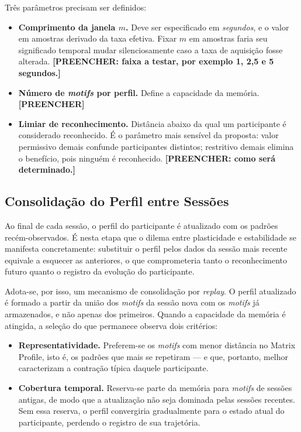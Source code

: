 Três parâmetros precisam ser definidos:

\begin{itemize}
    \item \textbf{Comprimento da janela $m$.} Deve ser especificado em
    \textit{segundos}, e o valor em amostras derivado da taxa efetiva.
    Fixar $m$ em amostras faria seu significado temporal mudar
    silenciosamente caso a taxa de aquisição fosse alterada.
    \textbf{[PREENCHER: faixa a testar, por exemplo 1, 2{,}5 e 5
    segundos.]}

    \item \textbf{Número de \textit{motifs} por perfil.} Define a
    capacidade da memória. \textbf{[PREENCHER]}

    \item \textbf{Limiar de reconhecimento.} Distância abaixo da qual um
    participante é considerado reconhecido. É o parâmetro mais sensível
    da proposta: valor permissivo demais confunde participantes
    distintos; restritivo demais elimina o benefício, pois ninguém é
    reconhecido. \textbf{[PREENCHER: como será determinado.]}
\end{itemize}

\subsection{Consolidação do Perfil entre Sessões}

Ao final de cada sessão, o perfil do participante é atualizado com os
padrões recém-observados. É nesta etapa que o dilema entre plasticidade
e estabilidade se manifesta concretamente: substituir o perfil pelos
dados da sessão mais recente equivale a esquecer as anteriores, o que
comprometeria tanto o reconhecimento futuro quanto o registro da
evolução do participante.

Adota-se, por isso, um mecanismo de consolidação por \textit{replay}. O
perfil atualizado é formado a partir da união dos \textit{motifs} da
sessão nova com os \textit{motifs} já armazenados, e não apenas dos
primeiros. Quando a capacidade da memória é atingida, a seleção do que
permanece observa dois critérios:

\begin{itemize}
    \item \textbf{Representatividade.} Preferem-se os \textit{motifs}
    com menor distância no Matrix Profile, isto é, os padrões que mais
    se repetiram --- e que, portanto, melhor caracterizam a contração
    típica daquele participante.

    \item \textbf{Cobertura temporal.} Reserva-se parte da memória para
    \textit{motifs} de sessões antigas, de modo que a atualização não
    seja dominada pelas sessões recentes. Sem essa reserva, o perfil
    convergiria gradualmente para o estado atual do participante,
    perdendo o registro de sua trajetória.
\end{itemize}

